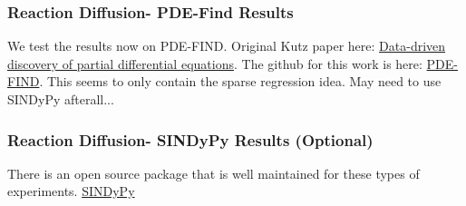 \documentclass[12pt]{article}
\begin{document}
\subsubsection{Reaction Diffusion- PDE-Find Results}
We test the results now on PDE-FIND. Original Kutz paper here: \href{https://www.science.org/doi/pdf/10.1126/sciadv.1602614}{Data-driven discovery of partial differential equations}.
The github for this work is here: \href{https://github.com/snagcliffs/PDE-FIND}{PDE-FIND}.
This seems to only contain the sparse regression idea. May need to use SINDyPy afterall...

\subsubsection{Reaction Diffusion- SINDyPy Results (Optional)}
There is an open source package that is well maintained for these types of experiments.
\href{https://github.com/dynamicslab/pysindy}{SINDyPy}
\end{document}
